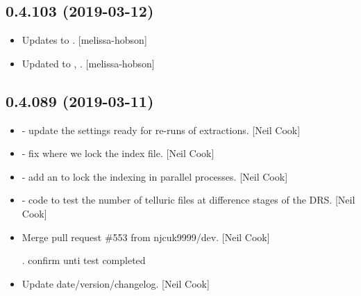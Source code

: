 \documentclass[a4paper,10pt,english]{report}
\begin{document}
\subsection{0.4.103 (2019-03-12)}
\label{\detokenize{misc/changelog:id171}}\begin{itemize}
\item {} 
Updates to . {[}melissa-hobson{]}

\item {} 
Updated to , . {[}melissa-hobson{]}

\end{itemize}


\subsection{0.4.089 (2019-03-11)}
\label{\detokenize{misc/changelog:id172}}\begin{itemize}
\item {} 
 - update the settings ready for re-runs of
extractions. {[}Neil Cook{]}

\item {} 
 - fix where we lock the index file. {[}Neil Cook{]}

\item {} 
 - add an  to lock the indexing in
parallel processes. {[}Neil Cook{]}

\item {} 
 - code to test the number of telluric files
at difference stages of the DRS. {[}Neil Cook{]}

\item {} 
Merge pull request \#553 from njcuk9999/dev. {[}Neil Cook{]}

. confirm unti test completed

\item {} 
Update date/version/changelog. {[}Neil Cook{]}

\end{itemize}
\end{document}
